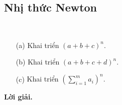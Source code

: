 \subsection{Nhị thức Newton}

\begin{tcolorbox}[breakable]
    \begin{baitoan}~
        \label{pb:w01:02}

        \begin{enumerate}
            \item[(a)] {Khai triển $(a + b + c)^n$.}
            \item[(b)] {Khai triển $(a + b + c + d)^n$.} 
            \item[(c)] {Khai triển $\displaystyle\left(\sum\limits_{i=1}^m a_i\right)^n$.} 
        \end{enumerate}
    \end{baitoan}
\end{tcolorbox}

\textbf{Lời giải. }

